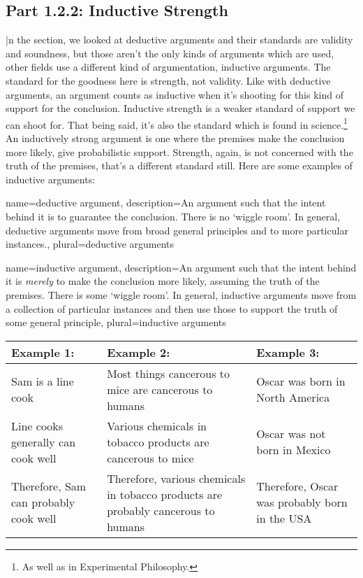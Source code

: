 \subsection{Part 1.2.2: Inductive Strength}
\label{s:p1.2.2}

|n the section, we looked at deductive arguments and their standards are validity and soundness, but those aren't the only kinds of arguments which are used, other fields use a different kind of argumentation, \glspl{inductive argument}. The standard for the goodness here is strength, not validity. Like with deductive arguments, an argument counts as inductive when it's shooting for this kind of support for the conclusion. Inductive strength is a weaker standard of support we can shoot for. That being said, it's also the standard which is found in science.\footnote{As well as in Experimental Philosophy.} An inductively strong argument is one where the premises make the conclusion more likely, give probabilistic support. Strength, again, is not concerned with the truth of the premises, that's a different standard still. Here are some examples of inductive arguments:

{
name=deductive argument,
description={An argument such that the intent behind it is to guarantee the conclusion. There is no ‘wiggle room'. In general, deductive arguments move from broad general principles and to more particular instances.},
plural=deductive arguments
}

{
name=inductive argument,
description={An argument such that the intent behind it is \emph{merely} to make the conclusion more likely, assuming the truth of the premises. There is some ‘wiggle room'. In general, inductive arguments move from a collection of particular instances and then use those to support the truth of some general principle},
plural=inductive arguments
}

\noindent
\begin{tabular}{p{2in}|p{2in}|p{2in}}
Example 1: &Example 2: &Example 3:\\\hline
Sam is a line cook &Most things cancerous to mice are cancerous to humans &Oscar was born in North America\\
Line cooks generally can cook well &Various chemicals in tobacco products are cancerous to mice &Oscar was not born in Mexico\\
Therefore, Sam can probably cook well &Therefore, various chemicals in tobacco products are probably cancerous to humans &Therefore, Oscar was probably born in the USA
\end{tabular}

